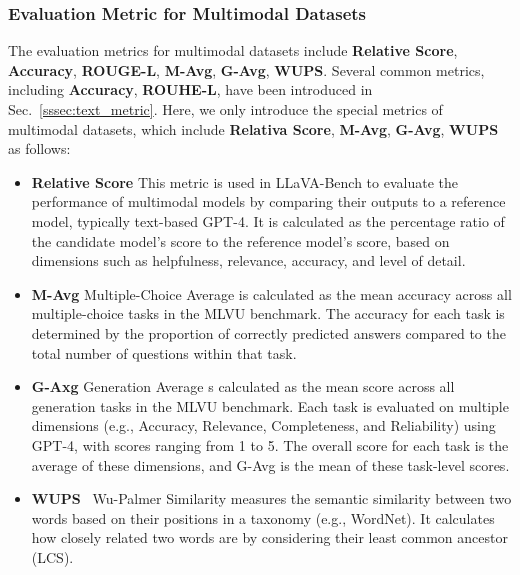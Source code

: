 \subsubsection{Evaluation Metric for Multimodal Datasets}
The evaluation metrics for multimodal datasets include \textbf{Relative Score}, \textbf{Accuracy}, \textbf{ROUGE-L}, \textbf{M-Avg}, \textbf{G-Avg}, \textbf{WUPS}. 
Several common metrics, including \textbf{Accuracy}, \textbf{ROUHE-L}, have been introduced in Sec.~\ref{sssec:text_metric}.
Here, we only introduce the special metrics of multimodal datasets, which include \textbf{Relativa Score}, \textbf{M-Avg}, \textbf{G-Avg}, \textbf{WUPS} as follows:
\begin{itemize}[leftmargin=10pt]
    \item \textbf{Relative Score} This metric is used in LLaVA-Bench to evaluate the performance of multimodal models by comparing their outputs to a reference model, typically text-based GPT-4. It is calculated as the percentage ratio of the candidate model's score to the reference model's score, based on dimensions such as helpfulness, relevance, accuracy, and level of detail.
    
    \item \textbf{M-Avg} Multiple-Choice Average  is calculated as the mean accuracy across all multiple-choice tasks in the MLVU benchmark. The accuracy for each task is determined by the proportion of correctly predicted answers compared to the total number of questions within that task.

    \item \textbf{G-Axg} Generation Average s calculated as the mean score across all generation tasks in the MLVU benchmark. Each task is evaluated on multiple dimensions (e.g., Accuracy, Relevance, Completeness, and Reliability) using GPT-4, with scores ranging from 1 to 5. The overall score for each task is the average of these dimensions, and G-Avg is the mean of these task-level scores.

    \item \textbf{WUPS}~\cite{k2012newsimilaritymeasuretaxonomy} Wu-Palmer Similarity measures the semantic similarity between two words based on their positions in a taxonomy (e.g., WordNet). It calculates how closely related two words are by considering their least common ancestor (LCS).

\end{itemize}